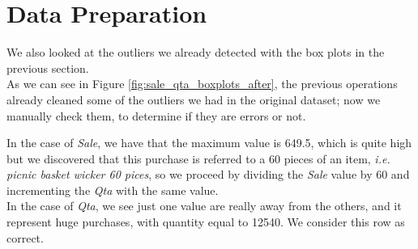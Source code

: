 \section{Data Preparation}

We also looked at the outliers we already detected with the box plots in the previous section.\\
As we can see in Figure \ref{fig:sale_qta_boxplots_after}, the previous operations already cleaned some of the outliers we had in the original dataset; now we manually check them, to determine if they are errors or not.

In the case of \emph{Sale}, we have that the maximum value is 649.5, which is quite high but we discovered that this purchase is referred to a 60 pieces of an item, \emph{i.e. picnic basket wicker 60 pices}, so we proceed by dividing the \emph{Sale} value by 60 and incrementing the \emph{Qta} with the same value.\\
In the case of \emph{Qta}, we see just one value are really away from the others, and it represent huge purchases, with quantity equal to 12540. We consider this row as correct.

